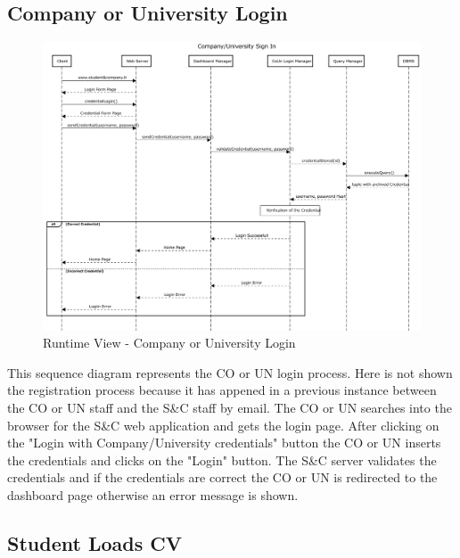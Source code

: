 \subsection{Company or University Login}
\label{sub:company-or-university-login}%

\begin{figure}[H]
      \centering
      \includegraphics[width=1.0\textwidth]{Images/RV_01b.pdf}
      \caption{Runtime View - Company or University Login}
      \label{fig:rv-company-or-university-login}
\end{figure}

\par This sequence diagram represents the CO or UN login process. Here is not shown the registration process because it has 
appened in a previous instance between the CO or UN staff and the S\&C staff by email. The CO or UN searches into the browser for the S\&C 
web application and gets the login page. After clicking on the "Login with Company/University credentials" button the CO or UN
inserts the credentials and clicks on the "Login" button. The S\&C server validates the credentials and if the credentials
are correct the CO or UN is redirected to the dashboard page otherwise an error message is shown.

\subsection{Student Loads CV}
\label{sub:student-loads-cv}%

